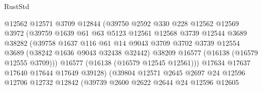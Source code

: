 \begin{lexlean}{RustStd}
\begin{coremodule}
                                @12562
                                @12571
                                @3709
                                @12844
                                (@39750
                                  @2592
                                  @330
                                  @228
                                  @12562
                                  @12569
                                  @3972
                                  (@39759
                                    @1639
                                    @61
                                    @63
                                    @5123
                                    @12561
                                    @12568
                                    @3739
                                    @12544
                                    @3689
                                    @38282
                                    (@39758
                                      @1637
                                      @116
                                      @61
                                      @14
                                      @9043
                                      @3709
                                      @3702
                                      @3739
                                      @12554
                                      @3689
                                      (@38242 @1636 @9043 @32438 @32442)
                                      @38209
                                      @16577
                                      (@16138 (@16579 @12555 @3709)))
                                    @16577
                                    (@16138 (@16579 @12545 @12561)))
                                  @17634
                                  @17637
                                  @17640
                                  @17644
                                  @17649
                                  @39128)
                                (@39804
                                  @12571
                                  @2645
                                  @2697
                                  @24
                                  @12596
                                  @12706
                                  @12732
                                  @12842
                                  (@39739
                                    @2600
                                    @2622
                                    @2644
                                    @24
                                    @12596
                                    @12605

\end{coremodule}
\end{lexlean}
